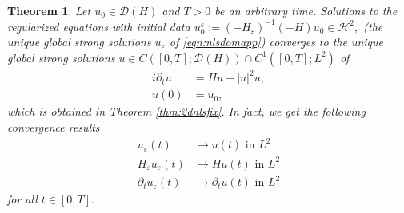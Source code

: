 \documentclass[11pt, oneside]{article}   	%
\newtheorem{theorem}{Theorem}[section]
\newcommand{\ssp}{\mathscr{H}}
\begin{document}
\begin{theorem} \label{thm:2ddomnls}
	Let $u_0 \in \mathscr{D} (H)$ and $T>0$ be  an arbitrary time.  Solutions to the regularized equations with initial data $u^\varepsilon_0:=(-H_\varepsilon)^{-1}(-H)u_0\in \ssp^2,$ (the unique global strong solutions $u_\varepsilon$ of \eqref{eqn:nlsdomapp}) converges to the unique global strong solutions  $u \in C([0, T] ; \mathscr{D}(H))\cap C^{1} ([0,
	T] ; L^2)$ of
	\begin{align*}
	 i \partial_t u &= H u -|u|^2 u,  \\
	 u(0)&=u_0,
	\end{align*}
	which is obtained in Theorem \ref{thm:2dnlsfix}. In fact, we get the following convergence results
		\begin{align*}
		u_{\varepsilon}(t)&\to u(t) \text{ in }L^2\\
		H_{\varepsilon} u_{\varepsilon}(t)&\to H u(t) \text{ in }L^2\\
		\partial_t u_{\varepsilon}(t)&\to \partial_t u(t) \text{ in }L^2
		\end{align*}
		for all $t\in[0,T].$
\end{theorem}
\end{document}
